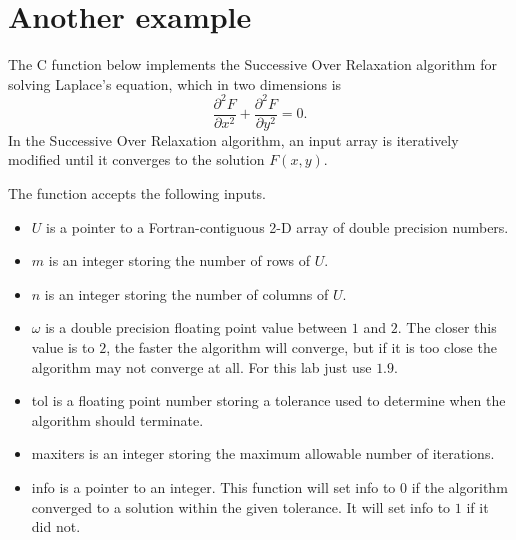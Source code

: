 \section*{Another example}


The C function  below implements the Successive Over Relaxation algorithm for solving Laplace's equation, which in two dimensions is
\[
\frac{\partial^2 F}{\partial x^2} + \frac{\partial^2 F}{\partial y^2} = 0.
\]
In the Successive Over Relaxation algorithm, an input array is iteratively modified until it converges to the solution $F(x,y)$.



The function  accepts the following inputs.
\begin{itemize}
\item $U$ is a pointer to a Fortran-contiguous 2-D array of double precision numbers.
\item $m$ is an integer storing the number of rows of $U$.
\item $n$ is an integer storing the number of columns of $U$.
\item $\omega$ is a double precision floating point value between $1$ and $2$.
The closer this value is to $2$, the faster the algorithm will converge, but if it is too close the algorithm may not converge at all.
For this lab just use $1.9$.
\item tol is a floating point number storing a tolerance used to determine when the algorithm should terminate.
\item maxiters is an integer storing the maximum allowable number of iterations.
\item info is a pointer to an integer.
This function will set info to $0$ if the algorithm converged to a solution within the given tolerance.
It will set info to $1$ if it did not.
\end{itemize}



